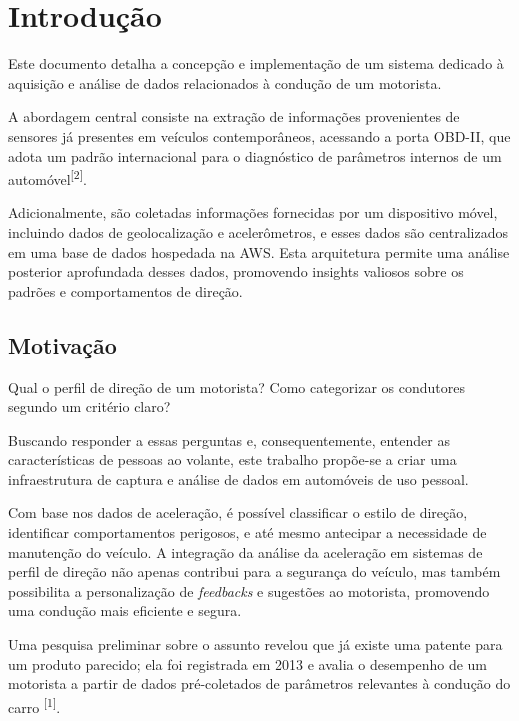 \chapter{Introdução}\label{CAP:introducao}

Este documento detalha a concepção e implementação de um sistema dedicado à aquisição e análise de dados relacionados à condução de um motorista.

A abordagem central consiste na extração de informações provenientes de sensores já presentes em veículos contemporâneos, acessando a porta OBD-II, que adota um padrão internacional para o diagnóstico de parâmetros internos de um automóvel\textsuperscript{[2]}.

Adicionalmente, são coletadas informações fornecidas por um dispositivo móvel, incluindo dados de geolocalização e acelerômetros, e esses dados são centralizados em uma base de dados hospedada na AWS. Esta arquitetura permite uma análise posterior aprofundada desses dados, promovendo insights valiosos sobre os padrões e comportamentos de direção.

\section{Motivação}

Qual o perfil de direção de um motorista? Como categorizar os condutores segundo um critério claro?

Buscando responder a essas perguntas e, consequentemente, entender as características de pessoas ao volante, este trabalho propõe-se a criar uma infraestrutura de captura e análise de dados em automóveis de uso pessoal.

Com base nos dados de aceleração, é possível classificar o estilo de direção, identificar comportamentos perigosos, e até mesmo antecipar a necessidade de manutenção do veículo. A integração da análise da aceleração em sistemas de perfil de direção não apenas contribui para a segurança do veículo, mas também possibilita a personalização de \textit{feedbacks} e sugestões ao motorista, promovendo uma condução mais eficiente e segura.

	
Uma pesquisa preliminar sobre o assunto revelou que já existe uma patente para um produto parecido; ela foi registrada em 2013 e avalia o desempenho de um motorista a partir de dados pré-coletados de parâmetros relevantes à condução do carro \textsuperscript{[1]}.

